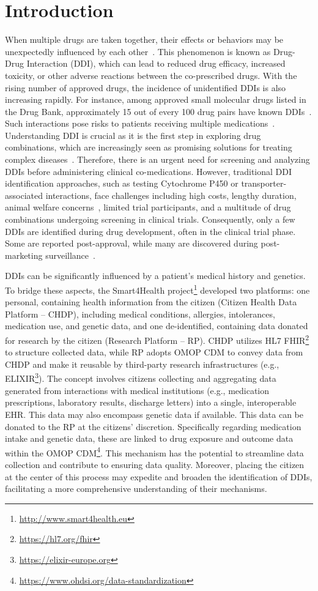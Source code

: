 \documentclass[unnumsec,webpdf,contemporary,large]{oup-authoring-template}%
\theoremstyle{thmstyleone}%
\theoremstyle{thmstyletwo}%
\theoremstyle{thmstylethree}%
\begin{document}
\section{Introduction}
When multiple drugs are taken together, their effects or behaviors may be unexpectedly influenced by each other~\cite{Wienkers2005}. This phenomenon is known as Drug-Drug Interaction (DDI), which can lead to reduced drug efficacy, increased toxicity, or other adverse reactions between the co-prescribed drugs. With the rising number of approved drugs, the incidence of unidentified DDIs is also increasing rapidly. For instance, among approved small molecular drugs listed in the Drug Bank, approximately 15 out of every 100 drug pairs have known DDIs~\cite{Law2014}. Such interactions pose risks to patients receiving multiple medications~\cite{Leape1995, PMID:28232141, Mulroy2017}. Understanding DDI is crucial as it is the first step in exploring drug combinations, which are increasingly seen as promising solutions for treating complex diseases~\cite{PMID:22219721}. Therefore, there is an urgent need for screening and analyzing DDIs before administering clinical co-medications. However, traditional DDI identification approaches, such as testing Cytochrome P450 or transporter-associated interactions, face challenges including high costs, lengthy duration, animal welfare concerns~\cite{Zhang2015}, limited trial participants, and a multitude of drug combinations undergoing screening in clinical trials. Consequently, only a few DDIs are identified during drug development, often in the clinical trial phase. Some are reported post-approval, while many are discovered during post-marketing surveillance~\cite{Karim2019}.

DDIs can be significantly influenced by a patient's medical history and genetics. To bridge these aspects, the Smart4Health project\footnote{\url{http://www.smart4health.eu}} developed two platforms: one personal, containing health information from the citizen (Citizen Health Data Platform – CHDP), including medical conditions, allergies, intolerances, medication use, and genetic data, and one de-identified, containing data donated for research by the citizen (Research Platform – RP). CHDP utilizes HL7 FHIR\footnote{\url{ https://hl7.org/fhir}} to structure collected data, while RP adopts OMOP CDM to convey data from CHDP and make it reusable by third-party research infrastructures (e.g., ELIXIR\footnote{\url{https://elixir-europe.org}}). The concept involves citizens collecting and aggregating data generated from interactions with medical institutions (e.g., medication prescriptions, laboratory results, discharge letters) into a single, interoperable EHR. This data may also encompass genetic data if available. This data can be donated to the RP at the citizens' discretion. Specifically regarding medication intake and genetic data, these are linked to drug exposure and outcome data within the OMOP CDM\footnote{\url{https://www.ohdsi.org/data-standardization}}. This mechanism has the potential to streamline data collection and contribute to ensuring data quality. Moreover, placing the citizen at the center of this process may expedite and broaden the identification of DDIs, facilitating a more comprehensive understanding of their mechanisms.
\end{document}
